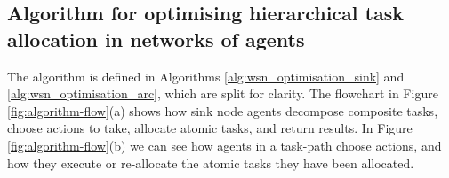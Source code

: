 \newcommand{\functionANHTAO}[2]{
	\functionSignature{\texttt{anhtao-path}}{\varAtomicTask{}{}, \varAgent{}{}}
}

\subsection{Algorithm for optimising hierarchical task allocation in networks of agents}

The \acronymWSNOptimisationExtended{}{} algorithm is defined in Algorithms \ref{alg:wsn_optimisation_sink}
and \ref{alg:wsn_optimisation_arc}, which are split for clarity. The flowchart in Figure \ref{fig:algorithm-flow}(a) shows how sink node agents decompose composite tasks, choose actions to take, allocate atomic tasks, and return results. In Figure \ref{fig:algorithm-flow}(b) we can see how agents in a task-path choose actions, and how they execute or re-allocate the atomic tasks they have been allocated.

